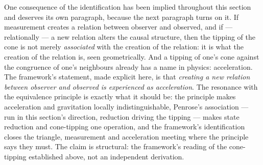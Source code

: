 
One consequence of the identification has been implied throughout this section and deserves its own
paragraph, because the next paragraph turns on it. If measurement creates a relation between
observer and observed, and if --- relationally --- a new relation alters the causal structure, then
the tipping of the cone is not merely \emph{associated} with the creation of the relation: it is
what the creation of the relation is, seen geometrically. And a tipping of one's cone against the
congruence of one's neighbours already has a name in physics: acceleration. The framework's
statement, made explicit here, is that \emph{creating a new relation between observer and observed
is experienced as acceleration}. The resonance with the equivalence principle is exactly what it
should be: the principle makes acceleration and gravitation locally indistinguishable, Penrose's
association --- run in this section's direction, reduction driving the tipping --- makes state
reduction and cone-tipping one operation, and the framework's identification closes the triangle,
measurement and acceleration meeting where the principle says they must. The claim is structural:
the framework's reading of the cone-tipping established above, not an independent derivation.

